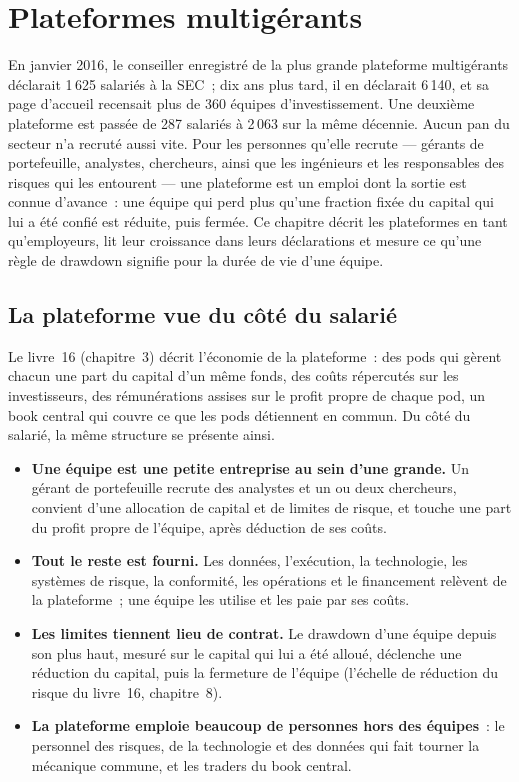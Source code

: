 \chapter{Plateformes multigérants}\label{ch:in:multi-manager-platforms}

En janvier 2016, le conseiller enregistré de la plus grande plateforme multigérants déclarait 1\,625 salariés à la SEC~; dix ans
plus tard, il en déclarait 6\,140, et sa page d'accueil recensait plus de 360 équipes d'investissement. Une deuxième plateforme est passée de 287
salariés à 2\,063 sur la même décennie. Aucun pan du secteur n'a recruté aussi vite. Pour les personnes qu'elle recrute --- gérants de
portefeuille, analystes, chercheurs, ainsi que les ingénieurs et les responsables des risques qui les entourent --- une plateforme est un emploi dont la sortie est connue
d'avance~: une équipe qui perd plus qu'une fraction fixée du capital qui lui a été confié est réduite, puis fermée. Ce
chapitre décrit les plateformes en tant qu'employeurs, lit leur croissance dans leurs déclarations et mesure ce qu'une règle de drawdown
signifie pour la durée de vie d'une équipe.

\section{La plateforme vue du côté du salarié}

Le livre~16 (chapitre~3) décrit l'économie de la plateforme~: des pods qui gèrent chacun une part du capital d'un même fonds, des coûts répercutés
sur les investisseurs, des rémunérations assises sur le profit propre de chaque pod, un book central qui couvre ce que les pods détiennent en commun. Du côté
du salarié, la même structure se présente ainsi.
\begin{itemize}
\item \textbf{Une équipe est une petite entreprise au sein d'une grande.} Un gérant de portefeuille recrute des analystes et un
ou deux chercheurs, convient d'une allocation de capital et de limites de risque, et touche une part du profit propre de l'équipe, après déduction de ses coûts.
\item \textbf{Tout le reste est fourni.} Les données, l'exécution, la technologie, les systèmes de risque, la conformité, les opérations et
le financement relèvent de la plateforme~; une équipe les utilise et les paie par ses coûts.
\item \textbf{Les limites tiennent lieu de contrat.} Le drawdown d'une équipe depuis son plus haut, mesuré sur le capital qui lui a été alloué,
déclenche une réduction du capital, puis la fermeture de l'équipe (l'échelle de réduction du risque du livre~16, chapitre~8).
\item \textbf{La plateforme emploie beaucoup de personnes hors des équipes}~: le personnel des risques, de la technologie et des données qui fait tourner la
mécanique commune, et les traders du book central.
\end{itemize}

